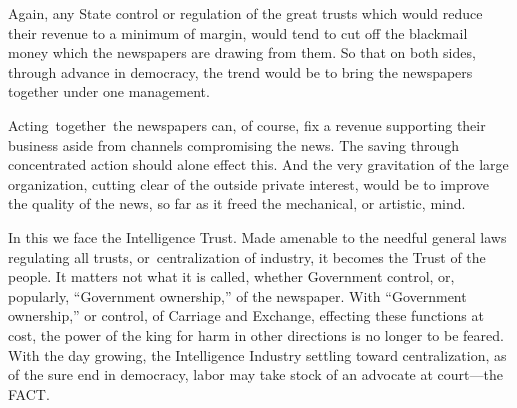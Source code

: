 \documentclass[openany,nobib]{tufte-book}
\begin{document}
\enlargethispage{\baselineskip}

Again, any State control or regulation of the great trusts which would
reduce their revenue to a minimum of margin, would tend to cut off the
blackmail money which the newspapers are drawing from them. So that on
both sides, through advance in democracy, the trend would be to bring
the newspapers together under one management.~

Acting~together~the newspapers can, of course, fix a revenue supporting
their business aside from channels compromising the news. The saving
through concentrated action should alone effect this. And the very
gravitation of the large organization, cutting clear of the outside
private interest, would be to improve the quality of the news, so far as
it freed the mechanical, or artistic, mind.~

In this we face the Intelligence Trust. Made amenable to the needful
general laws regulating all trusts, or~centralization of industry, it
becomes the Trust of the people. It matters not what it is called,
whether Government control, or, popularly, ``Government ownership,'' of
the newspaper. With ``Government ownership,'' or control, of Carriage
and Exchange, effecting these functions at cost, the power of the king
for harm in other directions is no longer to be feared. With the day
growing, the Intelligence Industry settling toward centralization, as of
the sure end in democracy, labor may take stock of an advocate at
court---the FACT.~

\vspace{0.05in}
\end{document}
